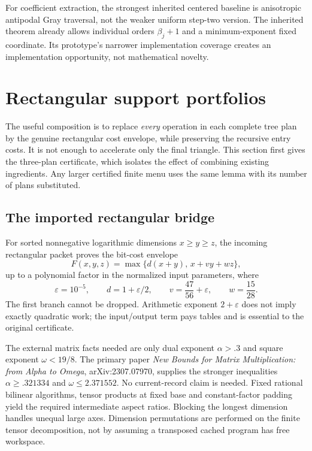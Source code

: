 \documentclass[11pt,letterpaper]{article}
\theoremstyle{remark}\newtheorem{remark}[theorem]{Remark}
\begin{document}
For coefficient extraction, the strongest inherited centered baseline is anisotropic antipodal Gray traversal, not the weaker uniform step-two version. The inherited theorem already allows individual orders $\beta_j+1$ and a minimum-exponent fixed coordinate. Its prototype's narrower implementation coverage creates an implementation opportunity, not mathematical novelty.

\section{Rectangular support portfolios}
\label{sec:rect}
The useful composition is to replace \emph{every} operation in each complete tree plan by the genuine rectangular cost envelope, while preserving the recursive entry costs. It is not enough to accelerate only the final triangle. This section first gives the three-plan certificate, which isolates the effect of combining existing ingredients. Any larger certified finite menu uses the same lemma with its number of plans substituted.

\subsection{The imported rectangular bridge}
For sorted nonnegative logarithmic dimensions $x\ge y\ge z$, the incoming rectangular packet proves the bit-cost envelope
\begin{equation}\label{eq:rectcost}
 F(x,y,z)=\max\{d(x+y),\,x+vy+wz\},
\end{equation}
up to a polynomial factor in the normalized input parameters, where
\[
 \varepsilon=10^{-5},\qquad d=1+\varepsilon/2,
 \qquad v=\frac{47}{56}+\varepsilon,\qquad w=\frac{15}{28}.
\]
The first branch cannot be dropped. Arithmetic exponent $2+\varepsilon$ does not imply exactly quadratic work; the input/output term pays tables and is essential to the original certificate.

The external matrix facts needed are only dual exponent $\alpha>.3$ and square exponent $\omega<19/8$. The primary paper \emph{New Bounds for Matrix Multiplication: from Alpha to Omega}, arXiv:2307.07970, supplies the stronger inequalities $\alpha\ge.321334$ and $\omega\le2.371552$. No current-record claim is needed. \cite{matrix} Fixed rational bilinear algorithms, tensor products at fixed base and constant-factor padding yield the required intermediate aspect ratios. Blocking the longest dimension handles unequal large axes. Dimension permutations are performed on the finite tensor decomposition, not by assuming a transposed cached program has free workspace.
\end{document}
